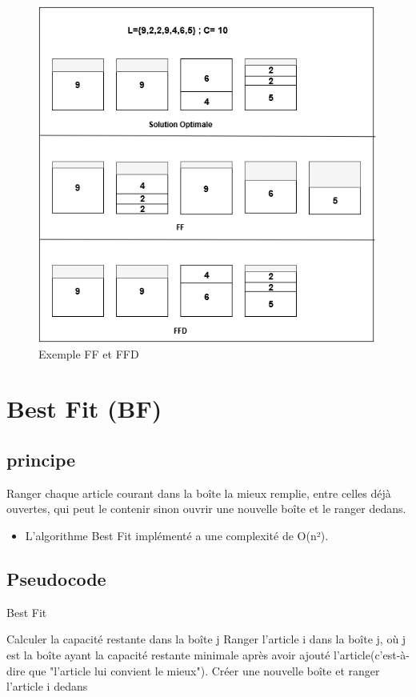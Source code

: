 \documentclass[12pt]{article}
\begin{document}
\begin{figure}[H]
    \includegraphics[width=\linewidth]{../figures/FF FFD.png}
    \caption{Exemple FF et FFD}
\end{figure}

\section{Best Fit (BF)}
\subsection{principe}
Ranger chaque article courant dans la boîte la mieux remplie, entre celles déjà ouvertes, qui peut le contenir sinon ouvrir une nouvelle boîte et le ranger dedans.
\begin{itemize}
    \item L’algorithme Best Fit implémenté a une complexité de O(n²).
\end{itemize}

\subsection{Pseudocode}
\begin{algorithm}[!h]
    \caption{Best Fit}
    \begin{algorithmic}
              \STATE Calculer la capacité restante dans la boîte j
             \ENDIF 
        \ENDFOR
        \STATE Ranger l’article i dans la boîte j, où j est la boîte ayant la capacité restante minimale après avoir ajouté l’article(c'est-à-dire que "l’article lui convient le mieux").
            \STATE Créer une nouvelle boîte et ranger l’article i dedans
        \ENDIF
    \ENDFOR
    \end{algorithmic}
\end{algorithm}
\end{document}
